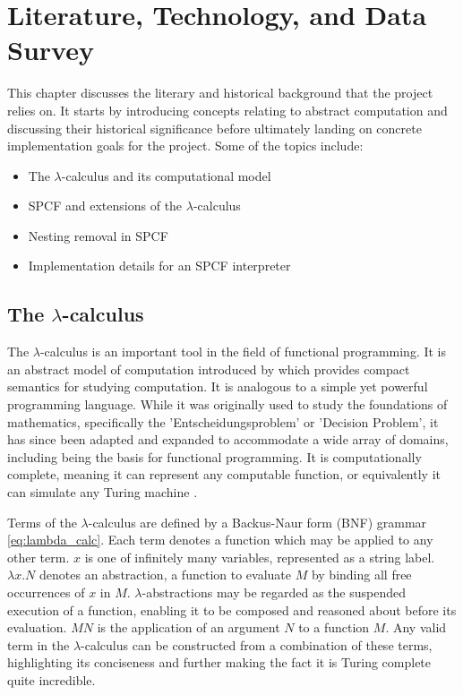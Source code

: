\documentclass[12pt,a4paper]{report}
\theoremstyle{definition}
\theoremstyle{definition}
\theoremstyle{remark}
\begin{document}
\chapter{Literature, Technology, and Data Survey}\label{chapter:lit-review}
This chapter discusses the literary and historical background that the project relies on. It starts by introducing concepts relating to abstract computation and discussing their historical significance before ultimately landing on concrete implementation goals for the project. Some of the topics include:
\begin{itemize}
    \item The $\lambda$-calculus and its computational model
    \item SPCF and extensions of the $\lambda$-calculus
    \item Nesting removal in SPCF
    \item Implementation details for an SPCF interpreter
\end{itemize}

\section{The \texorpdfstring{$\lambda$}{lambda}-calculus}
The $\lambda$-calculus is an important tool in the field of functional programming. It is an abstract model of computation introduced by \cite{church_1936} which provides compact semantics for studying computation. It is analogous to a simple yet powerful programming language. While it was originally used to study the foundations of mathematics, specifically the 'Entscheidungsproblem' or 'Decision Problem', it has since been adapted and expanded to accommodate a wide array of domains, including being the basis for functional programming. It is computationally complete, meaning it can represent any computable function, or equivalently it can simulate any Turing machine \cite{turing_1937}.

Terms of the $\lambda$-calculus are defined by a Backus-Naur form (BNF) grammar \eqref{eq:lambda_calc}. Each term denotes a function which may be applied to any other term. $x$ is one of infinitely many variables, represented as a string label. $\lambda x.N$ denotes an abstraction, a function to evaluate $M$ by binding all free occurrences of $x$ in $M$. $\lambda$-abstractions may be regarded as the suspended execution of a function, enabling it to be composed and reasoned about before its evaluation. $MN$ is the application of an argument $N$ to a function $M$. Any valid term in the $\lambda$-calculus can be constructed from a combination of these terms, highlighting its conciseness and further making the fact it is Turing complete quite incredible.
\end{document}
